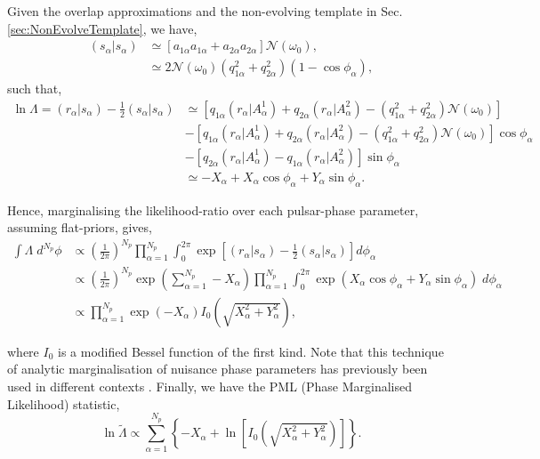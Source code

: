 \documentclass[twocolappendix,tighten]{emulateapj}
\begin{document}
Given the overlap approximations and the non-evolving template in Sec. \ref{sec:NonEvolveTemplate}, we have,
\begin{align}
(s_{\alpha}|s_{\alpha}) &\simeq \left[a_{1{\alpha}}a_{1{\alpha}} + a_{2{\alpha}}a_{2{\alpha}}\right]\mathcal{N}(\omega_0), \nonumber\\
&\simeq 2\mathcal{N}(\omega_0)\left(q_{1\alpha}^2+q_{2\alpha}^2\right)\left(1-\cos\phi_{\alpha}\right),
\end{align}
such that,
\begin{align} \label{eq:collapsedlnlambda}
\ln\Lambda = (r_{\alpha}|s_{\alpha}) - \frac{1}{2}(s_{\alpha}|s_{\alpha}) &\simeq \left[q_{1\alpha}(r_{\alpha}|A^1_{\alpha})+q_{2\alpha}(r_{\alpha}|A^2_{\alpha}) - \left(q_{1\alpha}^2+q_{2\alpha}^2\right)\mathcal{N}(\omega_0)\right] \nonumber\\
&- \left[q_{1\alpha}(r_{\alpha}|A^1_{\alpha})+q_{2\alpha}(r_{\alpha}|A^2_{\alpha}) - \left(q_{1\alpha}^2+q_{2\alpha}^2\right)\mathcal{N}(\omega_0)\right]\cos\phi_{\alpha}  \nonumber\\
&- \left[q_{2\alpha}(r_{\alpha}|A^1_{\alpha})-q_{1\alpha}(r_{\alpha}|A^2_{\alpha})\right]\sin\phi_{\alpha}\nonumber\\
&\simeq  -X_{\alpha} + X_{\alpha}\cos\phi_{\alpha} + Y_{\alpha}\sin\phi_{\alpha}.
\end{align}

Hence, marginalising the likelihood-ratio over each pulsar-phase parameter, assuming flat-priors, gives,
\begin{align}
\int\Lambda\;d^{N_p}\phi &\propto \left(\frac{1}{2\pi}\right)^{N_p}\prod_{\alpha=1}^{N_p}\int_0^{2\pi}\exp[(r_{\alpha}|s_{\alpha})-\frac{1}{2}(s_{\alpha}|s_{\alpha})]d\phi_{\alpha} \nonumber\\
&\propto \left(\frac{1}{2\pi}\right)^{N_p}\exp\left(\sum_{\alpha=1}^{N_p}-X_{\alpha}\right)\prod_{\alpha=1}^{N_p}\int_0^{2\pi}\exp(X_{\alpha}\cos\phi_{\alpha}+Y_{\alpha}\sin\phi_{\alpha})\;d\phi_{\alpha} \nonumber\\
&\propto \prod_{\alpha=1}^{N_p}\exp(-X_{\alpha})I_0\left(\sqrt{X_{\alpha}^2+Y_{\alpha}^2}\right),
\end{align}

where $I_0$ is a modified Bessel function of the first kind. Note that this technique of analytic marginalisation of nuisance phase parameters has previously been used in different contexts \citep{whalen1971detection,F-and-G}. Finally, we have the PML (Phase Marginalised Likelihood) statistic,
\begin{equation}
\ln\tilde\Lambda \propto \sum_{\alpha=1}^{N_p}\left\{-X_{\alpha} + \ln\left[I_0\left(\sqrt{X_{\alpha}^2+Y_{\alpha}^2}\right)\right]\right\}.
\end{equation}
\end{document}
